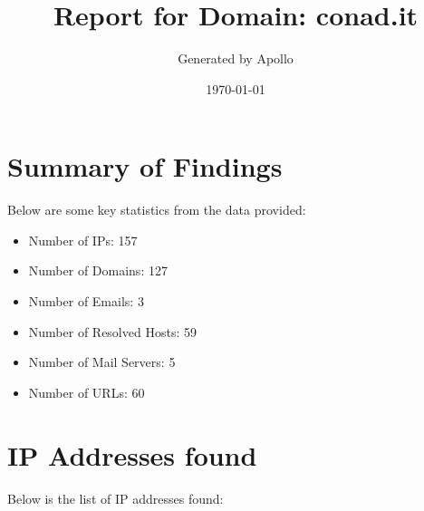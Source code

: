 \documentclass{article}
\title{Report for Domain: conad.it}
\author{Generated by Apollo}
\date{\today}
\begin{document}
\maketitle

\section*{Summary of Findings}

Below are some key statistics from the data provided:

\begin{itemize}
    \item Number of IPs: 157
    \item Number of Domains: 127
    \item Number of Emails: 3
    \item Number of Resolved Hosts: 59
    \item Number of Mail Servers: 5
    \item Number of URLs: 60
\end{itemize}

\section*{IP Addresses found}

Below is the list of IP addresses found:
\end{document}
